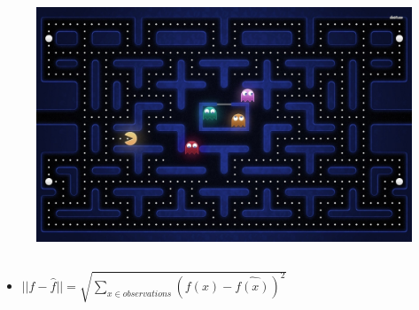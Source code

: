\documentclass{beamer}
\begin{document}
\begin{frame}
\begin{columns}[c]
\begin{figure}
\includegraphics[width=1.0\linewidth]{lucasplots/pac-man.jpg}
\end{figure}

\end{columns}

\begin{itemize}

\item $||f - \hat{f}|| = \sqrt{\sum\nolimits_{x \in observations}(f(x) - \hat{f(x)})^2}$ 
\end{itemize}


\end{frame}

\end{document}
